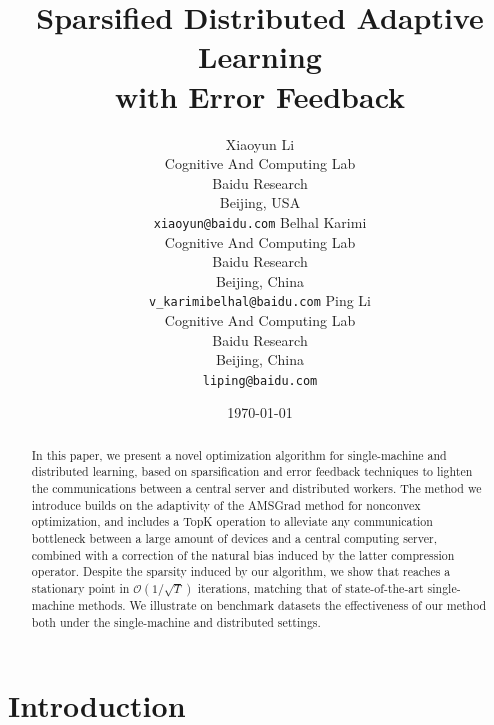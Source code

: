 \documentclass[11pt]{article}
\begin{document}
\title{Sparsified Distributed Adaptive Learning \\
with Error Feedback}

\author{
Xiaoyun Li \\
  Cognitive And Computing Lab\\
  Baidu Research\\
  Beijing, USA \\
  \texttt{xiaoyun@baidu.com} 
   \And
  Belhal Karimi \\
  Cognitive And Computing Lab\\
  Baidu Research\\
  Beijing, China \\
  \texttt{v_karimibelhal@baidu.com} 
   \And
  Ping Li \\
  Cognitive And Computing Lab\\
  Baidu Research\\
  Beijing, China \\
  \texttt{liping@baidu.com} \\
}

\date{\today}

\maketitle

\begin{abstract}
In this paper, we present a novel optimization algorithm for single-machine and distributed learning, based on sparsification and error feedback techniques to lighten the communications between a central server and distributed workers.
The method we introduce builds on the adaptivity of the AMSGrad method for nonconvex optimization, and includes a TopK operation to alleviate any communication bottleneck between a large amount of devices and a central computing server, combined with a correction of the natural bias induced by the latter compression operator.
Despite the sparsity induced by our algorithm, we show that \algo reaches a stationary point in $\mathcal{O}(1/ \sqrt{T})$ iterations, matching that of state-of-the-art single-machine methods.
We illustrate on benchmark datasets the effectiveness of our method both under the single-machine and distributed settings.
\end{abstract}

\section{Introduction}\label{sec:introduction}
\end{document}
